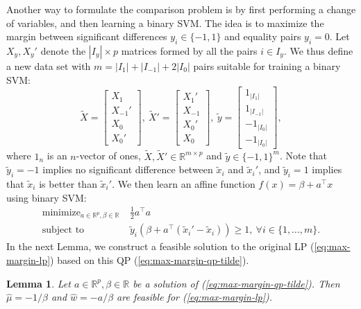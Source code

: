 \documentclass{article}
\newtheorem{lemma}{Lemma}
\newcommand{\RR}{\mathbb R}
\DeclareMathOperator*{\minimize}{minimize}
\begin{document}
Another way to formulate the comparison problem is by first performing
a change of variables, and then learning a binary SVM. The idea is to
maximize the margin between significant differences $y_i\in\{-1,1\}$
and equality pairs $y_i=0$. Let $X_y,X_y'$ denote the $|I_y|\times p$
matrices formed by all the pairs $i\in I_y$. We thus define a new data
set with $m=|I_1|+|I_{-1}|+2|I_0|$ pairs suitable for training a
binary SVM:
\begin{equation}
  \tilde X = \left[
    \begin{array}{c}
      X_1 \\
      X_{-1}'\\
      X_0\\
      X_0'
    \end{array}
  \right],\ 
  \tilde X' = \left[
    \begin{array}{c}
      X_1' \\
      X_{-1}\\
      X_0'\\
      X_0
    \end{array}
  \right],\ 
  \tilde y = \left[
    \begin{array}{c}
      1_{|I_1|} \\
      1_{|I_{-1}|}\\
      -1_{|I_0|}\\
      -1_{|I_0|}
    \end{array}
  \right],
\end{equation}
where $1_n$ is an $n$-vector of ones, $\tilde X,\tilde
X'\in\RR^{m\times p}$ and $\tilde y\in\{-1,1\}^m$. Note that $\tilde
y_i=-1$ implies no significant difference between $\tilde x_i$ and
$\tilde x_i'$, and $\tilde y_i=1$ implies that $\tilde x_i$ is better
than $\tilde x_i'$. We then learn an affine function
$f(x)=\beta+a^\intercal x$ using binary SVM:
\begin{equation}
  \label{eq:max-margin-qp-tilde}
  \begin{aligned}
    \minimize_{a\in\RR^p, \beta\in\RR}\ & \frac 1 2 a^\intercal a  \\
    \text{subject to}\ & 
    \tilde y_i (\beta + a^\intercal( \tilde x_i'-\tilde x_i) ) \geq 1,
    \ \forall i\in\{1,\dots,m\}.
  \end{aligned}
\end{equation}
In the next Lemma, we construct a feasible solution to the original LP
(\ref{eq:max-margin-lp}) based on this QP
(\ref{eq:max-margin-qp-tilde}).
\begin{lemma}
  Let $a\in\RR^p,\beta\in\RR$ be a solution of
  (\ref{eq:max-margin-qp-tilde}). Then $\hat \mu = -1/\beta$
  and $\hat w = -a/\beta$ are feasible for
  (\ref{eq:max-margin-lp}).
\end{lemma}
\end{document}
